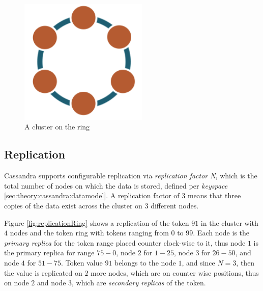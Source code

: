\begin{figure}[h]
	\centering
	\includegraphics[height=60mm]{images/cassandra-ring.png}\hspace{10mm}
	\caption{A cluster on the ring}
	\label{fig:archCluster}
\end{figure}

\subsection{Replication}
Cassandra supports configurable replication via \emph{replication factor N}, which is the total number of nodes on which the data is stored, defined per \emph{keyspace} \ref{sec:theory:cassandra:datamodel}. A replication factor of $3$ means that three copies of the data exist across the cluster on $3$ different nodes.

Figure \ref{fig:replicationRing} shows a replication of the token $91$ in the cluster with $4$ nodes and the token ring with tokens ranging from $0$ to $99$. 
Each node is the \emph{primary replica} for the token range placed counter clock-wise to it, thus node $1$ is the primary replica for range $75-0$, node $2$ for $1-25$, node $3$ for $26-50$, and node $4$ for $51-75$. 
Token value $91$ belongs to the node $1$, and since $N=3$, then the value is replicated on $2$ more nodes, which are on counter wise positions, thus on node $2$ and node $3$, which are \emph{secondary replicas} of the token. 

